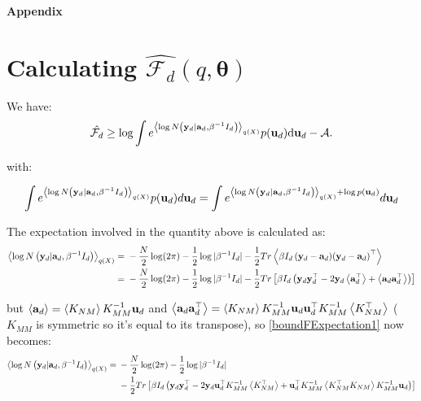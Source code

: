 \newpage
 \begin{center}
 \begin{Large}
 \textbf{
 Appendix
 } \\
 \end{Large}
 \end{center}
\appendix







\section{Calculating $\hat{\mathcal{F}_d}(q, \boldsymbol \theta)$}

We have:
\begin{equation}
\hat{\mathcal{F}_d} \geq
	\log \int e^{\left\langle \log N \left( \mathbf{y}_d | \mathbf{a}_d, \beta^{-1} I_d \right) \right\rangle_{q(X)}}
		p(\mathbf{u}_d) \text{d} \mathbf{u}_d -\mathcal{A} .
\end{equation}

with:

\begin{equation}
\label{boundFIntegral}
\int e^{\left\langle \log N \left( \mathbf{y}_d | \mathbf{a}_d, \beta^{-1} I_d \right) \right\rangle_{q(X)}}
		p(\mathbf{u}_d) d\mathbf{u}_d = 
\int e^{\left\langle \log N \left( \mathbf{y}_d | \mathbf{a}_d, \beta^{-1} I_d \right) \right\rangle_{q(X)} + \log p(\mathbf{u}_d)}
		d\mathbf{u}_d
\end{equation}

The expectation involved in the quantity above is calculated as:
\begin{align}
\left\langle \log N \left( \mathbf{y}_d | \mathbf{a}_d, \beta^{-1} I_d \right) \right\rangle_{q(X)} = {}& 
- \frac{N}{2} \log (2 \pi) - \frac{1}{2} \log \vert \beta^{-1} I_d \vert 
- \frac{1}{2} Tr \left\langle \beta I_d \left( \mathbf{y}_d - \mathbf{a}_d) (\mathbf{y}_d - \mathbf{a}_d \right)^{\top} \right\rangle \nonumber \\
={}&
- \frac{N}{2} \log ( 2 \pi ) - \frac{1}{2} \log \vert \beta^{-1} I_d \vert 
- \frac{1}{2} Tr \left[ \beta I_d \left( \mathbf{y}_d \mathbf{y}_d^{\top} - 
2 \mathbf{y}_d \left\langle \mathbf{a}_d^{\top} \right\rangle + \left\langle \mathbf{a}_d \mathbf{a}_d^{\top} \right\rangle \right) \right] \label{boundFExpectation1}
\end{align}

but $\left\langle \mathbf{a}_d \right\rangle = \left\langle K_{NM} \right\rangle K_{MM}^{-1} \mathbf{u}_d$ and 
$\left\langle \mathbf{a}_d \mathbf{a}_d^{\top} \right\rangle = \left\langle K_{NM} \right\rangle K_{MM}^{-1} \mathbf{u}_d \mathbf{u}_d^{\top} K_{MM}^{-1} \left\langle K_{NM}^{\top} \right\rangle$ ($K_{MM}$ is symmetric so it's equal to its transpose), so \eqref{boundFExpectation1} now becomes:
\begin{align}
\left\langle \log N \left( \mathbf{y}_d | \mathbf{a}_d, \beta^{-1} I_d \right) \right\rangle_{q(X)} = {}&
- \frac{N}{2} \log (2 \pi) - \frac{1}{2} \log \vert \beta^{-1} I_d \vert \nonumber \\
{}& - \frac{1}{2} Tr \left[
	\beta I_d \left( \mathbf{y}_d \mathbf{y}_d^{\top} - 2 \mathbf{y}_d \mathbf{u}_d^{\top} K_{MM}^{-1} \left\langle K_{NM}^{\top} \right\rangle + 
	\mathbf{u}_d^{\top} K_{MM}^{-1} \left\langle K_{NM}^{\top} K_{NM} \right\rangle K_{MM}^{-1} \mathbf{u}_d \right) \right]
\end{align}

